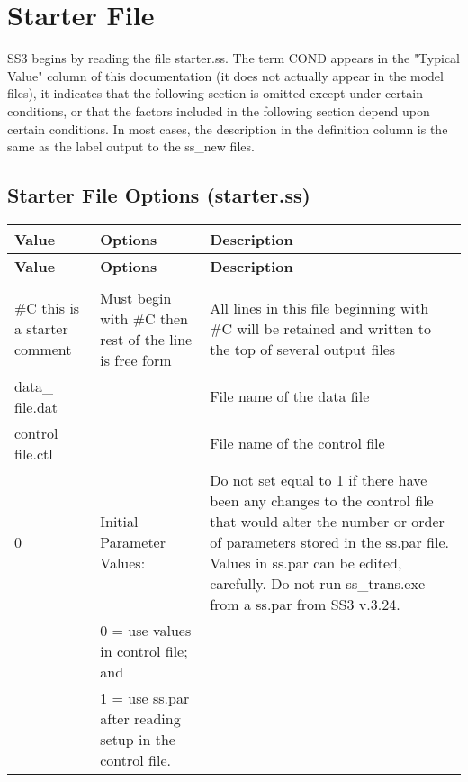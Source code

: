 
\section{Starter File}

SS3 begins by reading the file starter.ss. The term COND appears in the "Typical Value" column of this documentation (it does not actually appear in the model files), it indicates that the following section is omitted except under certain conditions, or that the factors included in the following section depend upon certain conditions. In most cases, the description in the definition column is the same as the label output to the ss\_new files.

{
\setlength\extrarowheight{4pt}
\begin{landscape}
\subsection{Starter File Options (starter.ss)}	

\begin{longtable}{p{1.5cm} p{7.2cm} p{12.3cm}} 

 \hline
 \textbf{Value} & \textbf{Options} & \textbf{Description} \TBstrut \\ 
 \hline
 \endfirsthead
 
 \hline
 \textbf{Value} & \textbf{Options} & \textbf{Description} \TBstrut \\ 
 \hline
 \endhead
 
 \hline
 \endfoot
 
 \hline
 \multicolumn{3}{ c }{ \textbf{End of Starter File}}\Tstrut\Bstrut\\
 \hline
 \endlastfoot

 \#C this is a starter comment & Must begin with \#C then rest of the line is free form & All lines in this file beginning with \#C will be retained and written to the top of several output files \Tstrut\\
		
 \hline
 data\_ file.dat &  & File name of the data file \Tstrut\\
		
 \hline
 control\_ file.ctl &  & File name of the control file \Tstrut\\
   
 \hline		
 0 & Initial Parameter Values: & \multirow{1}{1cm}[-0.25cm]{\parbox{12.5cm}{Do not set equal to 1 if there have been any changes to the control file that would alter the number or order of parameters stored in the ss.par file.  Values in ss.par can be edited, carefully. Do not run ss\_trans.exe from a ss.par from SS3 v.3.24.}}\Tstrut\\
 & 0 = use values in control file; and&  \\
 & 1 = use ss.par after reading setup in the control file. & \\
		

\end{longtable}
\end{landscape}}
